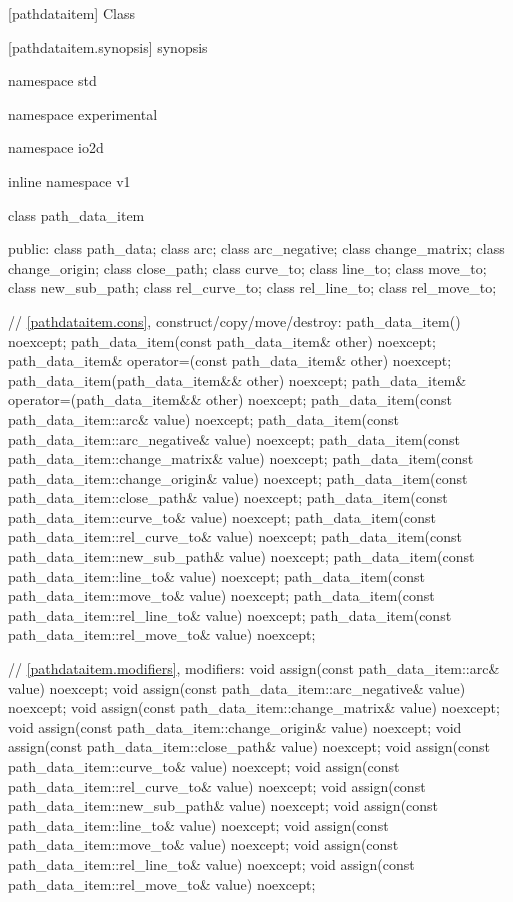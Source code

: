  [pathdataitem] {Class }

 [pathdataitem.synopsis] { synopsis}

\begin{codeblock}
namespace std { namespace experimental { namespace io2d { inline namespace v1 {
  class path_data_item {
  public:
    class path_data;
    class arc;
    class arc_negative;
    class change_matrix;
    class change_origin;
    class close_path;
    class curve_to;
    class line_to;
    class move_to;
    class new_sub_path;
    class rel_curve_to;
    class rel_line_to;
    class rel_move_to;
    
    // \ref{pathdataitem.cons}, construct/copy/move/destroy:
    path_data_item() noexcept;
    path_data_item(const path_data_item& other) noexcept;
    path_data_item& operator=(const path_data_item& other) noexcept;
    path_data_item(path_data_item&& other) noexcept;
    path_data_item& operator=(path_data_item&& other) noexcept;
    path_data_item(const path_data_item::arc& value) noexcept;
    path_data_item(const path_data_item::arc_negative& value) noexcept;
    path_data_item(const path_data_item::change_matrix& value) noexcept;
    path_data_item(const path_data_item::change_origin& value) noexcept;
    path_data_item(const path_data_item::close_path& value) noexcept;
    path_data_item(const path_data_item::curve_to& value) noexcept;
    path_data_item(const path_data_item::rel_curve_to& value) noexcept;
    path_data_item(const path_data_item::new_sub_path& value) noexcept;
    path_data_item(const path_data_item::line_to& value) noexcept;
    path_data_item(const path_data_item::move_to& value) noexcept;
    path_data_item(const path_data_item::rel_line_to& value) noexcept;
    path_data_item(const path_data_item::rel_move_to& value) noexcept;

    // \ref{pathdataitem.modifiers}, modifiers:
    void assign(const path_data_item::arc& value) noexcept;
    void assign(const path_data_item::arc_negative& value) noexcept;
    void assign(const path_data_item::change_matrix& value) noexcept;
    void assign(const path_data_item::change_origin& value) noexcept;
    void assign(const path_data_item::close_path& value) noexcept;
    void assign(const path_data_item::curve_to& value) noexcept;
    void assign(const path_data_item::rel_curve_to& value) noexcept;
    void assign(const path_data_item::new_sub_path& value) noexcept;
    void assign(const path_data_item::line_to& value) noexcept;
    void assign(const path_data_item::move_to& value) noexcept;
    void assign(const path_data_item::rel_line_to& value) noexcept;
    void assign(const path_data_item::rel_move_to& value) noexcept;

}}}}}
\end{codeblock}

